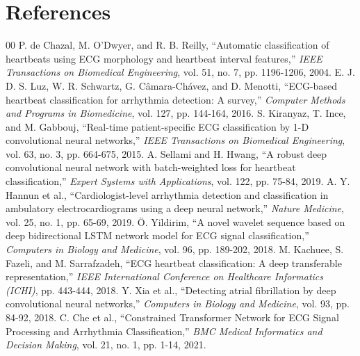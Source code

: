 \documentclass[11pt, conference]{IEEEtran}
\begin{document}
\section*{References}
\begin{thebibliography}{00}
 P. de Chazal, M. O'Dwyer, and R. B. Reilly, ``Automatic classification of heartbeats using ECG morphology and heartbeat interval features,'' \textit{IEEE Transactions on Biomedical Engineering}, vol. 51, no. 7, pp. 1196-1206, 2004.
 E. J. D. S. Luz, W. R. Schwartz, G. Câmara-Chávez, and D. Menotti, ``ECG-based heartbeat classification for arrhythmia detection: A survey,'' \textit{Computer Methods and Programs in Biomedicine}, vol. 127, pp. 144-164, 2016.
 S. Kiranyaz, T. Ince, and M. Gabbouj, ``Real-time patient-specific ECG classification by 1-D convolutional neural networks,'' \textit{IEEE Transactions on Biomedical Engineering}, vol. 63, no. 3, pp. 664-675, 2015.
 A. Sellami and H. Hwang, ``A robust deep convolutional neural network with batch-weighted loss for heartbeat classification,'' \textit{Expert Systems with Applications}, vol. 122, pp. 75-84, 2019.
 A. Y. Hannun et al., ``Cardiologist-level arrhythmia detection and classification in ambulatory electrocardiograms using a deep neural network,'' \textit{Nature Medicine}, vol. 25, no. 1, pp. 65-69, 2019.
 Ö. Yildirim, ``A novel wavelet sequence based on deep bidirectional LSTM network model for ECG signal classification,'' \textit{Computers in Biology and Medicine}, vol. 96, pp. 189-202, 2018.
 M. Kachuee, S. Fazeli, and M. Sarrafzadeh, ``ECG heartbeat classification: A deep transferable representation,'' \textit{IEEE International Conference on Healthcare Informatics (ICHI)}, pp. 443-444, 2018.
 Y. Xia et al., ``Detecting atrial fibrillation by deep convolutional neural networks,'' \textit{Computers in Biology and Medicine}, vol. 93, pp. 84-92, 2018.
 C. Che et al., ``Constrained Transformer Network for ECG Signal Processing and Arrhythmia Classification,'' \textit{BMC Medical Informatics and Decision Making}, vol. 21, no. 1, pp. 1-14, 2021.
\end{thebibliography}
\end{document}

